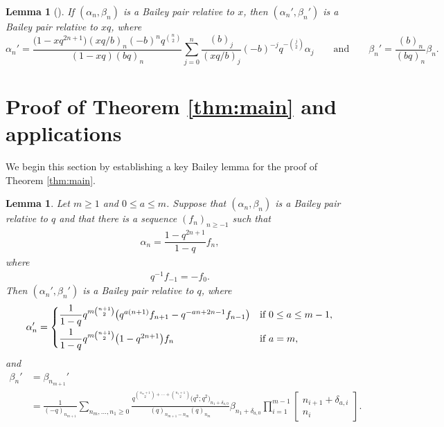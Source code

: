 \documentclass[pdftex]{sigma}
\newtheorem{Lemma}[Theorem]{Lemma}
\numberwithin{equation}{section}
\begin{document}
\begin{Lemma}[\cite{Lo0}] \label{1toqlemma}
	If $(\alpha_n,\beta_n)$ is a Bailey pair relative to $x$, then $(\alpha_n',\beta_n')$ is a Bailey pair relative to $xq$, where
	\begin{equation*}
		\alpha_n' =\frac{\bigl(1-xq^{2n+1}\bigr)(xq/b)_n(-b)^nq^{\binom{n}{2}}}{(1-xq)(bq)_n} \sum_{j=0}^n \frac{(b)_j}{(xq/b)_j}(-b)^{-j}q^{-\binom{j}{2}}\alpha_j
	\qquad
	\text{and}
	\qquad
		\beta_n' = \frac{(b)_n}{(bq)_n} \beta_n.
	\end{equation*}
\end{Lemma}






\section{Proof of Theorem \ref{thm:main} and applications}
\label{sec:mainthm}

We begin this section by establishing a key Bailey lemma for the proof of Theorem \ref{thm:main}.
\begin{Lemma} \label{lemma:mainpair}
	Let $m \geq 1$ and $0 \leq a \leq m$. Suppose that $(\alpha_n,\beta_n)$ is a Bailey pair relative to $q$ and that there is a sequence $(f_n)_{n \geq -1}$ such that
	\begin{align} \label{eqn:fdeflater}
		\alpha_n=\dfrac{1-q^{2n+1}}{1-q}f_n,
	\end{align}
	where
	\begin{align}
		q^{-1}f_{-1}=-f_0.
		\label{eqn:f-1f0}
	\end{align}
	Then $(\alpha_n',\beta_n')$ is a Bailey pair relative to $q$, where
	\begin{equation*} %
		\alpha_n' =
		\begin{cases}
			\dfrac{1}{1-q}q^{m\binom{n+1}{2}}\bigl(
			q^{a(n+1)}f_{n+1} -q^{-an+2n-1}f_{n-1}
			\bigr) & \text{if $0 \leq a \leq m-1$}, \vspace{1mm}\\
			\dfrac{1}{1-q}q^{m \binom{n+1}{2}}\bigl(1-q^{2n+1}\bigr)f_n &\text{if $a=m$},
		\end{cases}
	\end{equation*}
	and
	\begin{align}
		\beta_n' &{}= \beta_{n_{m+1}}' \nonumber \\
 &{}= \frac{1}{(-q)_{n_{m+1}}} \sum_{n_m, \dots, n_1 \geq 0} \frac{q^{\binom{n_m+1}{2} + \cdots + \binom{n_1+1}{2}}\bigl(q^2;q^2\bigr)_{n_1+\delta_{a,0}}}{(q)_{n_{m+1}-n_m} (q)_{n_m}} \beta_{n_1+\delta_{a,0}} \prod_{i=1}^{m-1} \begin{bmatrix} n_{i+1} + \delta_{a,i} \\ n_i \end{bmatrix}.\label{eqn:mainpairbeta}
	\end{align}
	
\end{Lemma}
\end{document}
